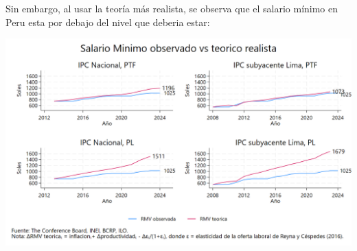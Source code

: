 \documentclass{beamer}
\begin{document}
\begin{frame}{Sin embargo, al usar la teoría más  realista, se observa que el salario mínimo en Peru esta por debajo del nivel que deberia estar:}
    \begin{center}
        \includegraphics[width=\linewidth]{rmv_determination_cone.png}
    \end{center}
\end{frame}
\end{document}
